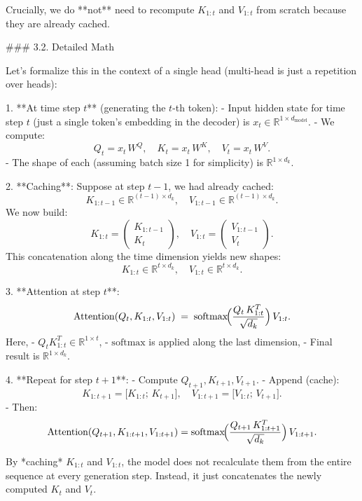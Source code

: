 Crucially, we do **not** need to recompute \(K_{1:t}\) and \(V_{1:t}\) from scratch because they are already cached.

### 3.2. Detailed Math

Let’s formalize this in the context of a single head (multi-head is just a repetition over heads):

1. **At time step \(t\)** (generating the \(t\)-th token):
   - Input hidden state for time step \(t\) (just a single token’s embedding in the decoder) is \(x_t \in \mathbb{R}^{1 \times d_\text{model}}\).
   - We compute:
     \[
     Q_t = x_t\, W^Q, \quad
     K_t = x_t\, W^K, \quad
     V_t = x_t\, W^V.
     \]
   - The shape of each (assuming batch size 1 for simplicity) is \(\mathbb{R}^{1 \times d_k}\).
   
2. **Caching**:  
   Suppose at step \(t-1\), we had already cached:
   \[
   K_{1:t-1} \in \mathbb{R}^{(t-1) \times d_k}, \quad
   V_{1:t-1} \in \mathbb{R}^{(t-1) \times d_k}.
   \]
   We now build:
   \[
   K_{1:t} = 
   \begin{pmatrix}
   K_{1:t-1}\\ 
   K_t
   \end{pmatrix}, \quad
   V_{1:t} = 
   \begin{pmatrix}
   V_{1:t-1}\\ 
   V_t
   \end{pmatrix}.
   \]
   This concatenation along the time dimension yields new shapes:
   \[
   K_{1:t} \in \mathbb{R}^{t \times d_k}, \quad
   V_{1:t} \in \mathbb{R}^{t \times d_k}.
   \]

3. **Attention at step \(t\)**:
   \[
   \text{Attention}(Q_t, K_{1:t}, V_{1:t}) 
   \;=\; \mathrm{softmax}\!\Bigl(\frac{Q_t \, K_{1:t}^T}{\sqrt{d_k}}\Bigr)\, V_{1:t}.
   \]
   Here, 
   - \(Q_t K_{1:t}^T \in \mathbb{R}^{1 \times t}\),  
   - \(\mathrm{softmax}\) is applied along the last dimension,  
   - Final result is \(\mathbb{R}^{1 \times d_k}\).

4. **Repeat for step \(t+1\)**:
   - Compute \(Q_{t+1}, K_{t+1}, V_{t+1}\).  
   - Append (cache):
     \[
     K_{1:t+1} = \bigl[K_{1:t};\, K_{t+1}\bigr], \quad
     V_{1:t+1} = \bigl[V_{1:t};\, V_{t+1}\bigr].
     \]
   - Then:
     \[
     \text{Attention}(Q_{t+1}, K_{1:t+1}, V_{1:t+1})
     = \mathrm{softmax}\!\Bigl(\frac{Q_{t+1} \, K_{1:t+1}^T}{\sqrt{d_k}}\Bigr)\, V_{1:t+1}.
     \]

By *caching* \(K_{1:t}\) and \(V_{1:t}\), the model does not recalculate them from the entire sequence at every generation step. Instead, it just concatenates the newly computed \(K_t\) and \(V_t\).

